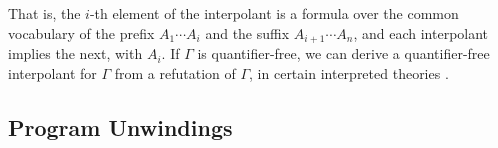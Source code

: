 That is, the $i$-th element of the interpolant is a formula over the common vocabulary of the prefix $A_1 \cdots A_i$ and the suffix $A_{i+1} \cdots A_n$, and each interpolant implies the next, with $A_i$. If $\Gamma$ is quantifier-free, we can derive a quantifier-free interpolant for $\Gamma$ from a refutation of $\Gamma$, in certain interpreted theories \cite{mcmillan05}.

\subsection{Program Unwindings}

